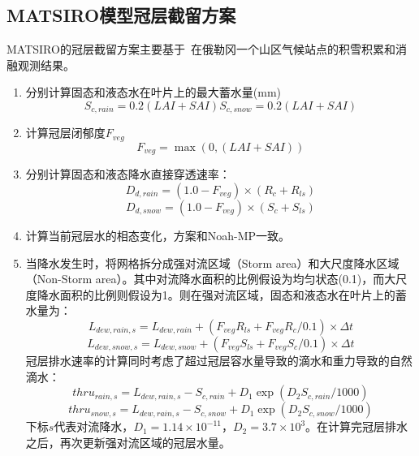 \subsection{MATSIRO模型冠层截留方案}
MATSIRO的冠层截留方案主要基于~\cite{storck2002measurement}在俄勒冈一个山区气候站点的积雪积累和消融观测结果。
\begin{enumerate}
\item 分别计算固态和液态水在叶片上的最大蓄水量(mm)\\
\begin{equation}
S_{c,rain}=0.2\left(LAI+SAI\right)
S_{c,snow}=0.2\left(LAI+SAI\right)
\end{equation}

\item 计算冠层闭郁度$F_{veg}$
\begin{equation}
F_{veg} = \max(0, \left(LAI+SAI\right))
\end{equation}
\item 分别计算固态和液态降水直接穿透速率：
\begin{equation}
D_{d,rain}=\left(1.0-F_{veg}\right) \times (R_{c}+R_{ls})
\end{equation}
\begin{equation}
D_{d,snow}=\left(1.0-F_{veg}\right) \times (S_{c}+S_{ls})
\end{equation}
\item 计算当前冠层水的相态变化，方案和Noah-MP一致。

\item 当降水发生时，将网格拆分成强对流区域（Storm area）和大尺度降水区域（Non-Storm area）。其中对流降水面积的比例假设为均匀状态(0.1)，而大尺度降水面积的比例则假设为1。则在强对流区域，固态和液态水在叶片上的蓄水量为：
\begin{equation}
L_{dew,rain,s}=L_{dew,rain}+(F_{veg}R_{ls}+F_{veg}R_{c}/0.1)\times \Delta{t}
\end{equation}
\begin{equation}
L_{dew,snow,s}=L_{dew,snow}+(F_{veg}S_{ls}+F_{veg}S_{c}/0.1)\times \Delta{t}
\end{equation}
冠层排水速率的计算同时考虑了超过冠层容水量导致的滴水和重力导致的自然滴水：
\begin{equation}
thru_{rain,s}=L_{dew,rain,s}-S_{c,rain}+D_{1} \exp \left(D_{2} S_{c,rain}/1000\right)
\end{equation}
\begin{equation}
thru_{snow,s}=L_{dew,rain,s}-S_{c,snow}+D_{1} \exp \left(D_{2} S_{c,snow}/1000\right)
\end{equation}
下标$s$代表对流降水，$D_{1}=1.14 \times 10^{-11}$，$D_{2}=3.7 \times 10^{3}$。在计算完冠层排水之后，再次更新强对流区域的冠层水量。


\end{enumerate}
